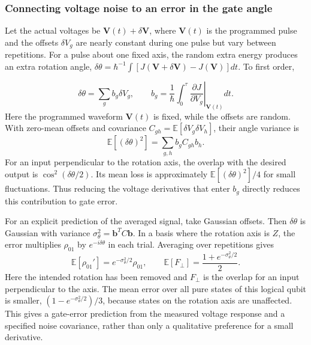 \subsubsection{Connecting voltage noise to an error in the gate angle}
Let the actual voltages be $\mathbf V(t)+\delta\mathbf V$, where
$\mathbf V(t)$ is the programmed pulse and the offsets
$\delta V_g$ are nearly constant during one pulse but vary between
repetitions. For a pulse about one fixed axis, the random extra
energy produces an extra rotation angle,
$\delta\theta=\hbar^{-1}\int[J(\mathbf V+\delta\mathbf V)
-J(\mathbf V)]dt$. To first order,

\begin{equation}
 \delta\theta
   =\sum_g b_g\delta V_g,\qquad
 b_g=\frac1\hbar\int_0^\tau
        \left.\frac{\partial J}{\partial V_g}\right|_{\mathbf V(t)}dt.
 \label{eq:calibration-angle-noise}
\end{equation}
Here the programmed waveform $\mathbf V(t)$ is fixed, while the
offsets are random. With zero-mean offsets and covariance
$C_{gh}=\mathbb E[\delta V_g\delta V_h]$, their angle variance is
\[
 \mathbb E[(\delta\theta)^2]=\sum_{g,h}b_g C_{gh}b_h.
\]
For an input perpendicular to the rotation axis, the overlap with
the desired output is $\cos^2(\delta\theta/2)$.
Its mean loss is approximately
$\mathbb E[(\delta\theta)^2]/4$ for small fluctuations.
Thus reducing the voltage derivatives that enter $b_g$ directly
reduces this contribution to gate error.

For an explicit prediction of the averaged signal, take Gaussian
offsets. Then $\delta\theta$ is Gaussian with variance
$\sigma_\theta^2=\mathbf b^TC\mathbf b$. In a basis where the
rotation axis is $Z$, the error multiplies $\rho_{01}$ by
$e^{-i\delta\theta}$ in each trial. Averaging over repetitions gives
\begin{equation}
 \mathbb E[\rho_{01}']=e^{-\sigma_\theta^2/2}\rho_{01},
 \qquad
 \mathbb E[F_\perp]=\frac{1+e^{-\sigma_\theta^2/2}}2.
 \label{eq:calibration-angle-noise-channel}
\end{equation}
Here the intended rotation has been removed and $F_\perp$ is
the overlap for an input perpendicular to the axis.
The mean error over all pure states of this logical qubit is smaller,
$(1-e^{-\sigma_\theta^2/2})/3$, because states on the rotation
axis are unaffected. This gives a gate-error prediction from
the measured voltage response and a specified noise covariance,
rather than only a qualitative preference for a small derivative.

